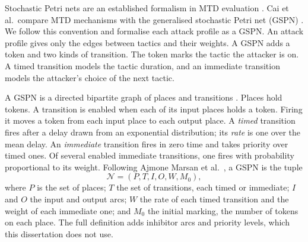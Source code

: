 \documentclass{cshonours}
\begin{document}
Stochastic Petri nets are an established formalism in MTD evaluation
\citep{chobenasher2018, mendonca2023}. Cai et al.\ compare MTD mechanisms
with the generalised stochastic Petri net (GSPN)
\citep{cai2016}. We follow this convention and formalise each attack profile
as a GSPN. An attack profile gives only the edges between tactics and their
weights. A GSPN adds a token and two kinds of transition. The token marks the
tactic the attacker is on. A timed transition models the tactic duration, and an immediate transition
models the attacker's choice of the next tactic.

A GSPN is a directed bipartite graph of places and transitions
\citep{marsan1984}. Places hold tokens. A transition is enabled when each of
its input places holds a token. Firing it moves a token from each input place
to each output place. A \emph{timed} transition fires after a delay drawn
from an exponential distribution; its \emph{rate} is one over the mean delay.
An \emph{immediate} transition fires in zero time and takes priority over
timed ones. Of several enabled immediate transitions, one fires with
probability proportional to its weight. Following Ajmone Marsan et al.\ \citep{marsan1995}, a GSPN is the tuple
\begin{equation}
  \mathcal{N} = (P, T, I, O, W, M_0),
  \label{eq:gspn}
\end{equation}
where $P$ is the set of places; $T$ the set of transitions, each timed or
immediate; $I$ and $O$ the input and output arcs; $W$ the rate of each timed
transition and the weight of each immediate one; and $M_0$ the initial
marking, the number of tokens on each place. The full definition adds
inhibitor arcs and priority levels, which this dissertation does not use.
\end{document}

